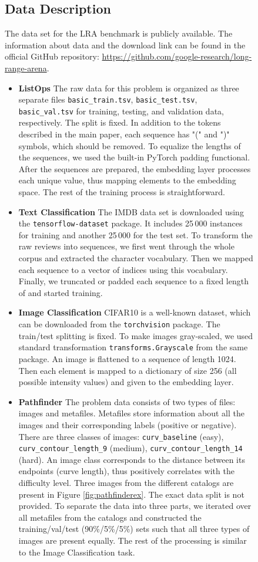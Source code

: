 \documentclass{article}
\begin{document}
\begin{figure}[t]
\begin{center}
\setlength\tabcolsep{3pt}


\subsection{Data Description}
The data set for the LRA benchmark is publicly available. The information about data and the download link can be found in the official GitHub repository: \url{https://github.com/google-research/long-range-arena}.
\begin{itemize}
    \item \textbf{ListOps} The raw data for this problem is organized as three separate files \texttt{basic\_train.tsv}, \texttt{basic\_test.tsv}, \texttt{basic\_val.tsv} for training, testing, and validation data, respectively. The split is fixed. In addition to the tokens described in the main paper, each sequence has "(" and ")" symbols, which should be removed. To equalize the lengths of the sequences, we used the built-in PyTorch padding functional. After the sequences are prepared, the embedding layer processes each unique value, thus mapping elements to the embedding space. The rest of the training process is straightforward. 
    \item \textbf{Text Classification} The IMDB data set is downloaded using the \texttt{tensorflow-dataset} package. It includes 25\,000 instances for training and another 25\,000 for the test set. To transform the raw reviews into sequences, we first went through the whole corpus and extracted the character vocabulary. Then we mapped each sequence to a vector of indices using this vocabulary. Finally, we truncated or padded each sequence to a fixed length of  and started training.
    \item \textbf{Image Classification} CIFAR10 is a well-known dataset, which can be downloaded from the \texttt{torchvision} package. The train/test splitting is fixed. To make images gray-scaled, we used standard transformation \texttt{transforms.Grayscale} from the same package. An image is flattened to a sequence of length 1024. Then each element is mapped to a dictionary of size 256 (all possible intensity values) and given to the embedding layer.  
    \item \textbf{Pathfinder} The problem data consists of two types of files: images and metafiles. Metafiles store information about all the images and their corresponding labels (positive or negative). There are three classes of images: \texttt{curv\_baseline} (easy), \texttt{curv\_contour\_length\_9} (medium), \texttt{curv\_contour\_length\_14} (hard). An image class corresponds to the distance between its endpoints (curve length), thus positively correlates with the difficulty level. Three images from the different catalogs are present in Figure \ref{fig:pathfinderex}. The exact data split is not provided. To separate the data into three parts, we iterated over all metafiles from the catalogs and constructed the training/val/test (90\%/5\%/5\%) sets such that all three types of images are present equally. The rest of the processing is similar to the Image Classification task.
\end{itemize}


\end{center}
\end{figure}
\end{document}
